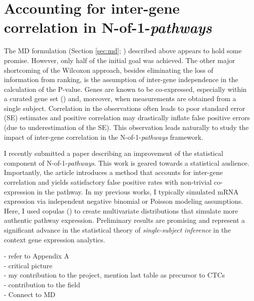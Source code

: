 \chapter{Accounting for inter-gene correlation in N-of-1-\emph{pathways}} \label{Chap:ct}

The MD formulation (Section \ref{sec:md}; \cite{Schissler2015}) described above appears to hold some promise. However, only half of the initial goal was achieved. The other major shortcoming of the Wilcoxon approach, besides eliminating the loss of information from ranking, is the assumption of inter-gene independence in the calculation of the P-value. Genes are known to be co-expressed, especially within a curated gene set (\cite{Tamayo2016}) and, moreover, when measurements are obtained from a single subject. Correlation in the observations often leads to poor standard error (SE) estimates and positive correlation may drastically inflate false positive errors (due to underestimation of the SE). This observation leads naturally to study the impact of inter-gene correlation in the N-of-1-\emph{pathways} framework.

I recently submitted a paper describing an improvement of the statistical component of N-of-1-\emph{pathways}. This work is geared towards a statistical audience. Importantly, the article introduces a method that accounts for inter-gene correlation and yields satisfactory false positive rates with non-trivial co-expression in the pathway. In my previous works, I typically simulated mRNA expression via independent negative binomial or Poisson modeling assumptions. Here, I used copulas (\cite{Genest2007,Yan2007}) to create multivariate distributions that simulate more authentic pathway expression. Preliminary results are promising and represent a significant advance in the statistical theory of \emph{single-subject inference} in the context gene expression analytics.

- refer to Appendix A \\
- critical picture\\
- my contribution to the project, mention last table as precursor to CTCs\\ 
- contribution to the field\\
- Connect to MD
